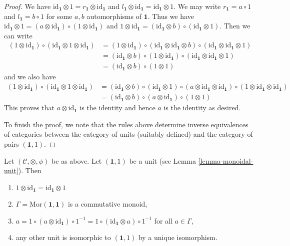 \begin{proof}
\medskip\noindent
We have
$\text{id}_\mathbf{1} \otimes 1 = r_\mathbf{1} \otimes \text{id}_\mathbf{1}$
and
$l_\mathbf{1} \otimes \text{id}_\mathbf{1} = \text{id}_\mathbf{1} \otimes 1$.
We may write $r_\mathbf{1} = a \circ 1$ and $l_\mathbf{1} = b \circ 1$
for some $a, b$ automorphisms of $\mathbf{1}$. Thus we have
$\text{id}_\mathbf{1} \otimes 1 =
(a \otimes \text{id}_\mathbf{1}) \circ (1 \otimes \text{id}_\mathbf{1})$
and
$1 \otimes \text{id}_\mathbf{1} =
(\text{id}_\mathbf{1} \otimes b) \circ (\text{id}_\mathbf{1} \otimes 1)$.
Then we can write
\begin{align*}
(1 \otimes \text{id}_\mathbf{1}) \circ
(\text{id}_\mathbf{1} \otimes 1 \otimes \text{id}_\mathbf{1})
& =
(1 \otimes \text{id}_\mathbf{1}) \circ
(\text{id}_\mathbf{1} \otimes \text{id}_\mathbf{1} \otimes b)
\circ
(\text{id}_\mathbf{1} \otimes \text{id}_\mathbf{1} \otimes 1) \\
& =
(\text{id}_\mathbf{1} \otimes b) \circ
(1 \otimes \text{id}_\mathbf{1}) \circ
(\text{id}_\mathbf{1} \otimes \text{id}_\mathbf{1} \otimes 1) \\
& =
(\text{id}_\mathbf{1} \otimes b) \circ
(1 \otimes 1)
\end{align*}
and we also have
\begin{align*}
(1 \otimes \text{id}_\mathbf{1}) \circ
(\text{id}_\mathbf{1} \otimes 1 \otimes \text{id}_\mathbf{1})
& =
(\text{id}_\mathbf{1} \otimes b) \circ
(\text{id}_\mathbf{1} \otimes 1) \circ
(a \otimes \text{id}_\mathbf{1} \otimes \text{id}_\mathbf{1}) \circ
(1 \otimes \text{id}_\mathbf{1} \otimes \text{id}_\mathbf{1}) \\
& =
(\text{id}_\mathbf{1} \otimes b) \circ
(a \otimes \text{id}_\mathbf{1}) \circ
(1 \otimes 1)
\end{align*}
This proves that $a \otimes \text{id}_\mathbf{1}$ is the identity and
hence $a$ is the identity as desired.

\medskip\noindent
To finish the proof, we note that the rules above determine
inverse equivalences of categories between the category of units
(suitably defined) and the category of pairs $(\mathbf{1}, 1)$.
\end{proof}

\begin{lemma}
\label{lemma-monoidal-unit-unique}
Let $(\mathcal{C}, \otimes, \phi)$ be as above.
Let $(\mathbf{1}, 1)$ be a unit (see Lemma \ref{lemma-monoidal-unit}).
Then
\begin{enumerate}
\item $1 \otimes \text{id}_\mathbf{1} = \text{id}_\mathbf{1} \otimes 1$
\item $\Gamma = \text{Mor}(\mathbf{1}, \mathbf{1})$ is a commutative monoid,
\item  $a = 1 \circ (a \otimes \text{id}_\mathbf{1}) \circ 1^{-1} =
1 \circ (\text{id}_\mathbf{1} \otimes a) \circ 1^{-1}$ for all $a \in \Gamma$,
\item any other unit is isomorphic to $(\mathbf{1}, 1)$
by a unique isomorphism.
\end{enumerate}
\end{lemma}

